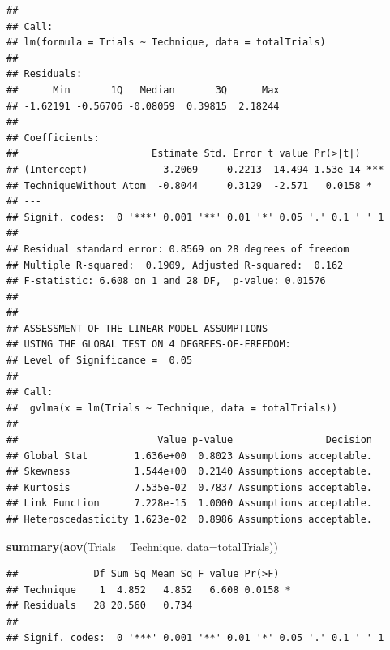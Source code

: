 \documentclass[]{article}
\newenvironment{Shaded}{\begin{snugshade}}{\end{snugshade}}
\newcommand{\DataTypeTok}[1]{\textcolor[rgb]{0.13,0.29,0.53}{#1}}
\newcommand{\DecValTok}[1]{\textcolor[rgb]{0.00,0.00,0.81}{#1}}
\newcommand{\KeywordTok}[1]{\textcolor[rgb]{0.13,0.29,0.53}{\textbf{#1}}}
\newcommand{\NormalTok}[1]{#1}
\newcommand{\OperatorTok}[1]{\textcolor[rgb]{0.81,0.36,0.00}{\textbf{#1}}}
\newcommand{\StringTok}[1]{\textcolor[rgb]{0.31,0.60,0.02}{#1}}
\begin{document}
\begin{verbatim}
## 
## Call:
## lm(formula = Trials ~ Technique, data = totalTrials)
## 
## Residuals:
##      Min       1Q   Median       3Q      Max 
## -1.62191 -0.56706 -0.08059  0.39815  2.18244 
## 
## Coefficients:
##                       Estimate Std. Error t value Pr(>|t|)    
## (Intercept)             3.2069     0.2213  14.494 1.53e-14 ***
## TechniqueWithout Atom  -0.8044     0.3129  -2.571   0.0158 *  
## ---
## Signif. codes:  0 '***' 0.001 '**' 0.01 '*' 0.05 '.' 0.1 ' ' 1
## 
## Residual standard error: 0.8569 on 28 degrees of freedom
## Multiple R-squared:  0.1909, Adjusted R-squared:  0.162 
## F-statistic: 6.608 on 1 and 28 DF,  p-value: 0.01576
## 
## 
## ASSESSMENT OF THE LINEAR MODEL ASSUMPTIONS
## USING THE GLOBAL TEST ON 4 DEGREES-OF-FREEDOM:
## Level of Significance =  0.05 
## 
## Call:
##  gvlma(x = lm(Trials ~ Technique, data = totalTrials)) 
## 
##                        Value p-value                Decision
## Global Stat        1.636e+00  0.8023 Assumptions acceptable.
## Skewness           1.544e+00  0.2140 Assumptions acceptable.
## Kurtosis           7.535e-02  0.7837 Assumptions acceptable.
## Link Function      7.228e-15  1.0000 Assumptions acceptable.
## Heteroscedasticity 1.623e-02  0.8986 Assumptions acceptable.
\end{verbatim}

\begin{Shaded}
\begin{Highlighting}[]
\KeywordTok{summary}\NormalTok{(}\KeywordTok{aov}\NormalTok{(Trials }\OperatorTok{~}\StringTok{ }\NormalTok{Technique, }\DataTypeTok{data=}\NormalTok{totalTrials))}
\end{Highlighting}
\end{Shaded}

\begin{verbatim}
##             Df Sum Sq Mean Sq F value Pr(>F)  
## Technique    1  4.852   4.852   6.608 0.0158 *
## Residuals   28 20.560   0.734                 
## ---
## Signif. codes:  0 '***' 0.001 '**' 0.01 '*' 0.05 '.' 0.1 ' ' 1
\end{verbatim}

\begin{Shaded}
\end{Shaded}
\end{document}
